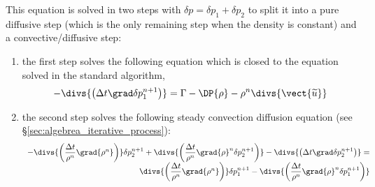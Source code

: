 This equation is solved in two steps with $\delta p = \delta p_1 + \delta p_2$
to split it into a pure diffusive step (which is the only remaining step when
the density is constant) and a convective/diffusive step:
%
\begin{enumerate}
 \item the first step solves the following equation which is closed to the equation solved in the standard algorithm,
\begin{equation}
 - \divs{ \left( \Delta t \grad \delta p_1^{n+1} \right) }
 = \Gamma - \DP{\rho} - \rho^n \divs{\vect{\widetilde{u}}}
 \label{eq:timstp:pression6}
\end{equation}
\item the second step solves the following steady convection diffusion equation
(see \S \ref{sec:algebrea_iterative_process}):
\begin{equation}
 \begin{array}{rcl}
  - \divs{ \left( \dfrac{\Delta t}{\rho^n} \grad{\rho^n} \right) } \delta p_2^{n+1}
  + \divs{ \left( \dfrac{\Delta t}{\rho^n} \grad{\rho}^n \delta p_2^{n+1} \right) }
  - \divs{ \left( \Delta t \grad \delta p_2^{n+1} \right) } = \\
    \divs{ \left( \dfrac{\Delta t}{\rho^n} \grad{\rho^n} \right) } \delta p_1^{n+1}
  - \divs{ \left( \dfrac{\Delta t}{\rho^n} \grad{\rho}^n \delta p_1^{n+1} \right) }
  \end{array}
 \label{eq:timstp:pression7}
\end{equation}
\end{enumerate}




